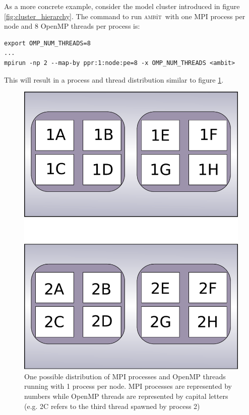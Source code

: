 \documentclass{report}
\newcommand{\ambit}{\textsc{amb}{\footnotesize i}\textsc{t}}
\begin{document}
As a more concrete example, 
consider the model cluster introduced in figure \ref{fig:cluster_hierarchy}. The command to run \ambit\ 
with one MPI process per node and 8 OpenMP threads per process is:

\begin{verbatim}
export OMP_NUM_THREADS=8
...
mpirun -np 2 --map-by ppr:1:node:pe=8 -x OMP_NUM_THREADS <ambit>
\end{verbatim}

This will result in a process and thread distribution similar to figure \ref{fig:hybrid_per_node}.

\begin{figure}
\includegraphics[height=0.5\textheight]{hybrid_map_by_node.pdf}
\caption{One possible distribution of MPI processes and OpenMP threads running with 1 process per node.
MPI processes are represented by numbers while OpenMP threads are represented by capital letters 
(e.g. 2C refers to the third thread spawned by process 2)}
\label{fig:hybrid_per_node}
\end{figure}
\end{document}
